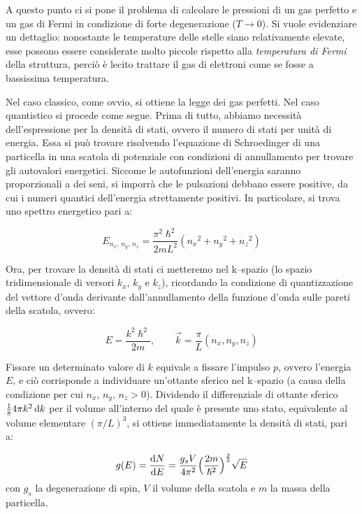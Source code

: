 A questo punto ci si pone il problema di calcolare le pressioni di un gas perfetto e un gas di Fermi in condizione di forte degenerazione ($T \to 0$). Si vuole evidenziare un dettaglio: nonostante le temperature delle stelle siano relativamente elevate, esse possono essere considerate molto piccole rispetto alla \emph{temperatura di Fermi} della struttura, perciò è lecito trattare il gas di elettroni come se fosse a bassissima temperatura. 

Nel caso classico, come ovvio, si ottiene la legge dei gas perfetti. Nel caso quantistico si procede come segue. Prima di tutto, abbiamo necessità dell'espressione per la densità di stati, ovvero il numero di stati per unità di energia. Essa si può trovare risolvendo l'equazione di Schroedinger di una particella in una scatola di potenziale con condizioni di annullamento per trovare gli autovalori energetici. Siccome le autofunzioni dell'energia saranno proporzionali a dei seni, si imporrà che le pulsazioni debbano essere positive, da cui i numeri quantici dell'energia strettamente positivi. In particolare, si trova uno spettro energetico pari a:

\begin{equation}
    E_{n_x, \, n_y, \, n_z} = \dfrac{{\pi}^2 \hslash^2}{2mL^2} ({n_x}^2 + {n_y}^2 + {n_z}^2)
\end{equation}

Ora, per trovare la densità di stati ci metteremo nel k--spazio (lo spazio tridimensionale di versori $k_x$, $k_y$ e $k_z$), ricordando la condizione di quantizzazione del vettore d'onda derivante dall'annullamento della funzione d'onda sulle pareti della scatola, ovvero:

\begin{equation}
    E = \dfrac{k^2 \hslash^2}{2m}, \qquad \Vec{k} = \frac{\pi}{L} (n_x, n_y, n_z)
\end{equation}

Fissare un determinato valore di $k$ equivale a fissare l'impulso $p$, ovvero l'energia $E$, e ciò corrisponde a individuare un'ottante sferico nel k--spazio (a causa della condizione per cui $n_x, \, n_y, \, n_z > 0$). Dividendo il differenziale di ottante sferico $\frac{1}{8} 4\pi k^2 \mathop{\mathrm{{}d}}\mathopen{} k$ per il volume all'interno del quale è presente uno stato, equivalente al volume elementare $(\pi/L)^3$, si ottiene immediatamente la densità di stati, pari a:

\begin{equation}
    g(E) = \dfrac{\mathop{\mathrm{{}d}}\mathopen{} N}{\mathop{\mathrm{{}d}}\mathopen{} E} = \dfrac{g_s V }{4 {\pi}^2} \Bigl( \dfrac{2m}{\hslash^2} \Bigr)^\frac{3}{2} \sqrt{E}
\end{equation}
con $g_s$ la degenerazione di spin, $V$ il volume della scatola e $m$ la massa della particella.

